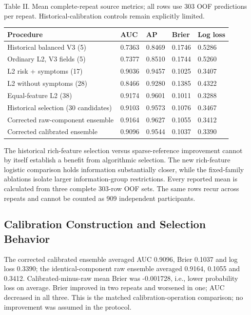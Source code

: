 \documentclass[conference,10pt]{IEEEtran}
\begin{document}
\begin{center}\begin{minipage}{\columnwidth}\centering\footnotesize
Table II. Mean complete-repeat source metrics; all rows use 303 OOF predictions per repeat. Historical-calibration controls remain explicitly limited.\par\vspace{3pt}
\setlength{\tabcolsep}{2.5pt}
\begin{tabular}{p{}p{}p{}p{}p{}}
\toprule
Procedure & AUC & AP & Brier & Log loss \\
\midrule
Historical balanced V3 (5) & 0.7363 & 0.8469 & 0.1746 & 0.5286 \\
Ordinary L2, V3 fields (5) & 0.7377 & 0.8510 & 0.1744 & 0.5260 \\
L2 risk + symptoms (17) & 0.9036 & 0.9457 & 0.1025 & 0.3407 \\
L2 without symptoms (28) & 0.8466 & 0.9280 & 0.1385 & 0.4322 \\
Equal-feature L2 (38) & 0.9174 & 0.9601 & 0.1011 & 0.3288 \\
Historical selection (30 candidates) & 0.9103 & 0.9573 & 0.1076 & 0.3467 \\
Corrected raw-component ensemble & 0.9164 & 0.9627 & 0.1055 & 0.3412 \\
Corrected calibrated ensemble & 0.9096 & 0.9544 & 0.1037 & 0.3390 \\
\bottomrule
\end{tabular}
\end{minipage}\end{center}

The historical rich-feature selection versus sparse-reference improvement cannot by itself establish a benefit from algorithmic selection. The new rich-feature logistic comparison holds information substantially closer, while the fixed-family ablations isolate larger information-group restrictions. Every reported mean is calculated from three complete 303-row OOF sets. The same rows recur across repeats and cannot be counted as 909 independent participants.

\subsection{Calibration Construction and Selection Behavior}
The corrected calibrated ensemble averaged AUC 0.9096, Brier 0.1037 and log loss 0.3390; the identical-component raw ensemble averaged 0.9164, 0.1055 and 0.3412. Calibrated-minus-raw mean Brier was -0.001728, i.e., lower probability loss on average. Brier improved in two repeats and worsened in one; AUC decreased in all three. This is the matched calibration-operation comparison; no improvement was assumed in the protocol.
\end{document}
